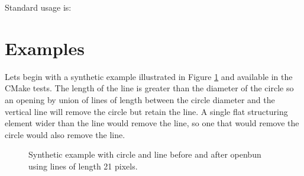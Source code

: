 \documentclass{InsightArticle}
\begin{document}
Standard usage is:


\section{Examples}
Lets begin with a synthetic example illustrated in Figure
\ref{fig:source_and_open} and available in the CMake tests. The length
of the line is greater than the diameter of the circle so an opening
by union of lines of length between the circle diameter and the
vertical line will remove the circle but retain the line. A single
flat structuring element wider than the line would remove the line, so
one that would remove the circle would also remove the line.
\begin{figure}[htbp]
\centering
{}
\caption{Synthetic example with circle and line before and after openbun using lines of length 21 pixels.\label{fig:source_and_open}}
\end{figure}


 \nocite{ITKSoftwareGuide}
\end{document}
